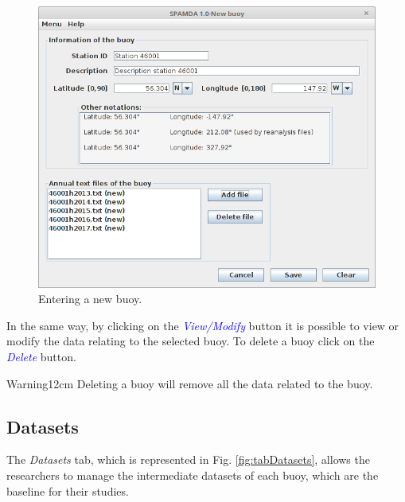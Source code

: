 \begin{onehalfspace}
				\begin{figure}[ht!]
					\centering
					\includegraphics[scale=0.41]{figures/enteringBuoy.png}
					\caption{Entering a new buoy.}
					\label{fig:enteringBuoy}
				\end{figure}
				
				In the same way, by clicking on the \textcolor{blue}{\textit{View/Modify}} button it is possible to view or modify the data relating to the selected buoy. To delete a buoy click on the \textcolor{blue}{\textit{Delete}} button.
				
				\begin{center}
					\begin{warningbox}{Warning}{12cm}
						Deleting a buoy will remove all the data related to the buoy.
					\end{warningbox}
				\end{center}
				
			\subsection{Datasets}\label{sec:Datasets}
			
				
				The \textit{Datasets} tab, which is represented in Fig. \ref{fig:tabDatasets}, allows the researchers to manage the intermediate datasets of each buoy, which are the baseline for their studies.
				

\end{onehalfspace}
